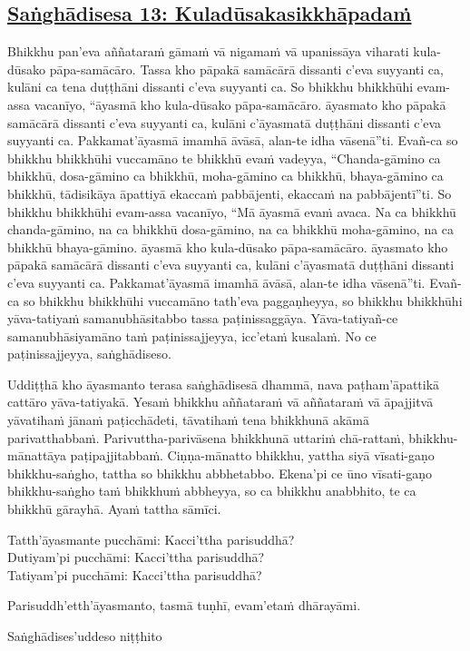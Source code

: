 \subsection*{\hyperref[comm13]{Saṅghādisesa 13: Kuladūsakasikkhāpadaṁ}}
\label{sd13}
Bhikkhu pan'eva aññataraṁ gāmaṁ vā nigamaṁ vā upanissāya viharati kula-dūsako pāpa-samācāro. Tassa kho pāpakā samācārā dissanti c'eva suyyanti ca, kulāni ca tena duṭṭhāni dissanti c'eva suyyanti ca. So bhikkhu bhikkhūhi evam-assa vacanīyo, “āyasmā kho kula-dūsako pāpa-samācāro. āyasmato kho pāpakā samācārā dissanti c'eva suyyanti ca, kulāni c'āyasmatā duṭṭhāni dissanti c'eva suyyanti ca. Pakkamat'āyasmā imamhā āvāsā, alan-te idha vāsenā”ti. Evañ-ca so bhikkhu bhikkhūhi vuccamāno te bhikkhū evaṁ vadeyya, “Chanda-gāmino ca bhikkhū, dosa-gāmino ca bhikkhū, moha-gāmino ca bhikkhū, bhaya-gāmino ca bhikkhū, tādisikāya āpattiyā ekaccaṁ pabbājenti, ekaccaṁ na pabbājentī”ti. So bhikkhu bhikkhūhi evam-assa vacanīyo, “Mā āyasmā evaṁ avaca. Na ca bhikkhū chanda-gāmino, na ca bhikkhū dosa-gāmino, na ca bhikkhū moha-gāmino, na ca bhikkhū bhaya-gāmino. āyasmā kho kula-dūsako pāpa-samācāro. āyasmato kho pāpakā samācārā dissanti c'eva suyyanti ca, kulāni c'āyasmatā duṭṭhāni dissanti c'eva suyyanti ca. Pakkamat'āyasmā imamhā āvāsā, alan-te idha vāsenā”ti. Evañ-ca so bhikkhu bhikkhūhi vuccamāno tath'eva paggaṇheyya, so bhikkhu bhikkhūhi yāva-tatiyaṁ samanubhāsitabbo tassa paṭinissaggāya. Yāva-tatiyañ-ce samanubhāsiyamāno taṁ paṭinissajjeyya, icc'etaṁ kusalaṁ. No ce paṭinissajjeyya, saṅghādiseso.

\medskip

\begin{center}
Uddiṭṭhā kho āyasmanto terasa saṅghādisesā dhammā, nava paṭham'āpattikā cattāro yāva-tatiyakā. Yesaṁ bhikkhu aññataraṁ vā aññataraṁ vā āpajjitvā yāvatihaṁ jānaṁ paṭicchādeti, tāvatihaṁ tena bhikkhunā akāmā parivatthabbaṁ. Parivuttha-parivāsena bhikkhunā uttariṁ chā-rattaṁ, bhikkhu-mānattāya paṭipajjitabbaṁ. Ciṇṇa-mānatto bhikkhu, yattha siyā vīsati-gaṇo bhikkhu-saṅgho, tattha so bhikkhu abbhetabbo. Ekena'pi ce ūno vīsati-gaṇo bhikkhu-saṅgho taṁ bhikkhuṁ abbheyya, so ca bhikkhu anabbhito, te ca bhikkhū gārayhā. Ayaṁ tattha sāmīci.

\smallskip

Tatth'āyasmante pucchāmi: Kacci'ttha parisuddhā?\\
Dutiyam'pi pucchāmi: Kacci'ttha parisuddhā?\\
Tatiyam'pi pucchāmi: Kacci'ttha parisuddhā?

\smallskip

Parisuddh'etth'āyasmanto, tasmā tuṇhī, evam'etaṁ dhārayāmi.
\end{center}

\begin{outro}
  Saṅghādises'uddeso niṭṭhito
\end{outro}

\clearpage
